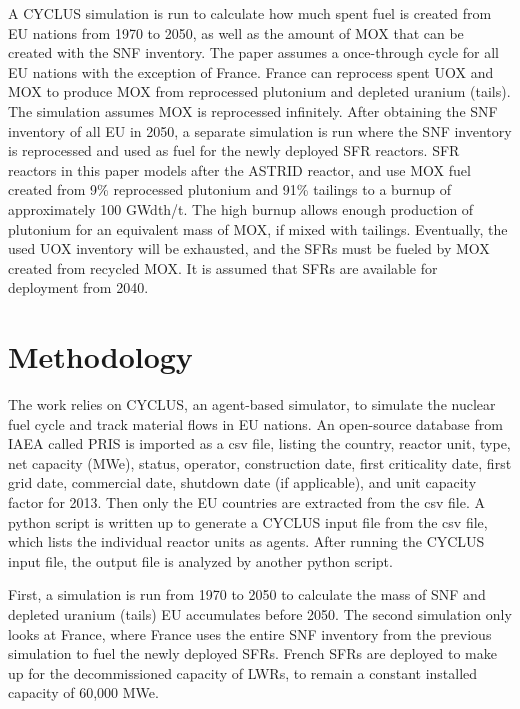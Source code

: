 A CYCLUS simulation is run to calculate
how much spent fuel is created from EU nations from 1970 to 2050, as well as the amount
of \gls{MOX} that can be created with the \gls{SNF} inventory.
The paper assumes a once-through cycle for all 
EU nations with the exception of France. France can reprocess spent \gls{UOX} and \gls{MOX} to
produce \gls{MOX} from reprocessed plutonium and depleted uranium (tails).
The simulation assumes \gls{MOX} is reprocessed infinitely. 
After obtaining the \gls{SNF} inventory of all EU in 2050, a separate
simulation is run where the \gls{SNF} inventory is reprocessed and
used as fuel for the newly deployed \gls{SFR} reactors.
\gls{SFR} reactors in this paper models after the ASTRID reactor,
and use \gls{MOX} fuel created from 9\% reprocessed plutonium
and 91\% tailings to a burnup
of approximately 100 GWdth/t. The high burnup allows enough production of plutonium
for an equivalent mass of \gls{MOX}, if mixed with tailings.  Eventually,
the used \gls{UOX} inventory will be exhausted, and the \glspl{SFR} must be
fueled by \gls{MOX} created from recycled \gls{MOX}.
It is assumed that \glspl{SFR} are available for deployment
from 2040. 


\section{Methodology}
The work relies on CYCLUS, an agent-based simulator, to simulate the nuclear fuel cycle
and track material flows in EU nations. An open-source database from \gls{IAEA} called
\gls{PRIS} is imported as a csv file, listing the country, reactor unit, type, net capacity (MWe), status,
operator, construction date, first criticality date, first grid date, commercial date, shutdown
date (if applicable), and unit capacity factor for 2013. Then only the EU countries are extracted
from the csv file. A python script is written up to generate a CYCLUS input file from the csv file,
which lists the individual reactor units as agents. After running the CYCLUS input file,
the output file is analyzed by another python script.

First, a simulation is run from 1970 to 2050 to calculate the mass of 
\gls{SNF} and depleted uranium (tails) EU accumulates before 2050. 
The second simulation only looks at France, where France
uses the entire \gls{SNF} inventory from the previous
simulation to fuel
the newly deployed \glspl{SFR}. French \gls{SFR}s are deployed
to make up for the decommissioned capacity of \gls{LWR}s, to
remain a constant installed capacity of 60,000 MWe.

